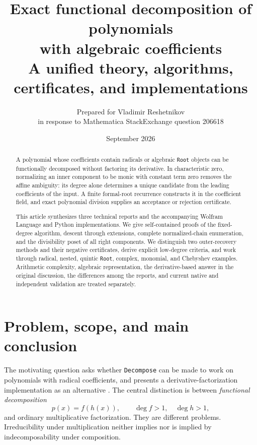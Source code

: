 \documentclass[11pt,a4paper]{article}
\numberwithin{equation}{section}
\theoremstyle{definition}
\theoremstyle{remark}
\newcommand{\code}[1]{\texttt{#1}}
\begin{document}
\title{Exact functional decomposition of polynomials\\
with algebraic coefficients\\[4pt]
\large A unified theory, algorithms, certificates, and implementations}
\author{Prepared for Vladimir Reshetnikov\\
\small in response to Mathematica StackExchange question 206618}
\date{September 2026}
\maketitle
\begin{abstract}
A polynomial whose coefficients contain radicals or algebraic \code{Root} objects can be
functionally decomposed without factoring its derivative.  In characteristic zero, normalizing
an inner component to be monic with constant term zero removes the affine ambiguity: its degree
alone determines a unique candidate from the leading coefficients of the input.  A finite
formal-root recurrence constructs it in the coefficient field, and exact polynomial division
supplies an acceptance or rejection certificate.

This article synthesizes three technical reports and the accompanying Wolfram Language and
Python implementations.  We give self-contained proofs of the fixed-degree algorithm, descent
through extensions, complete normalized-chain enumeration, and the divisibility poset of all
right components.  We distinguish two outer-recovery methods and their negative certificates,
derive explicit low-degree criteria, and work through radical, nested, quintic \code{Root},
complex, monomial, and Chebyshev examples.  Arithmetic complexity, algebraic representation,
the derivative-based answer in the original discussion, the differences among the reports,
and current native and independent validation are treated separately.
\end{abstract}
{\setlength{\parskip}{0pt}\small\tableofcontents}
\clearpage

\section{Problem, scope, and main conclusion}
\label{sec:intro}
The motivating question asks whether \code{Decompose} can be made to work on
polynomials with radical coefficients, and presents a derivative-factorization
implementation as an alternative \cite{SE}. The central distinction is between
\emph{functional decomposition}
\begin{equation}
 p(x)=f(h(x)),\qquad \deg f>1,\quad \deg h>1,
 \label{eq:problem}
\end{equation}
and ordinary multiplicative factorization. They are different problems.
Irreducibility under multiplication neither implies nor is implied by
indecomposability under composition.
\end{document}
